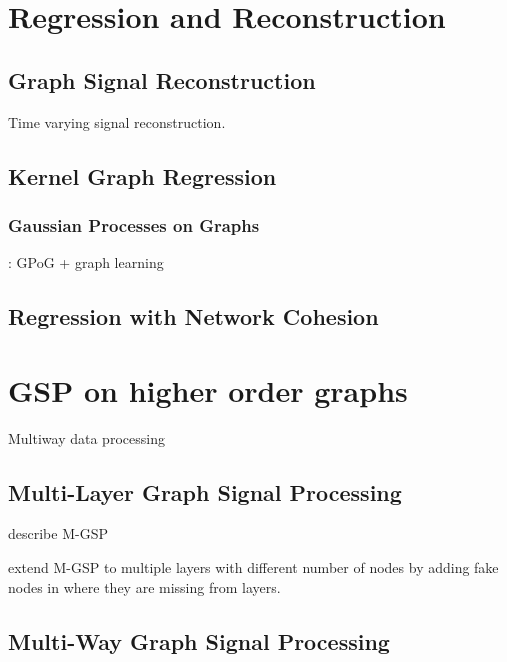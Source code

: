 \section{Regression and Reconstruction}


\subsection{Graph Signal Reconstruction}

\cite{Qiu2017} Time varying signal reconstruction. 

\subsection{Kernel Graph Regression}

\cite{Takeda2007}

\cite{Elias2022}

\cite{Venkitaraman2019}


\subsubsection{Gaussian Processes on Graphs}

\cite{Venkitaraman2020}

\cite{Miao2022}: GPoG + graph learning

\subsection{Regression with Network Cohesion}

\cite{Le2022}

\cite{Li2019}

\section{GSP on higher order graphs}

Multiway data processing 

\cite{Smilde2004}
\cite{Kroonenberg2008}


\cite{Ji2019}

\cite{Cammoun2009}




\subsection{Multi-Layer Graph Signal Processing}

\cite{Zhang2022} describe M-GSP 

\cite{Zhang2018} extend M-GSP to multiple layers with different number of nodes by adding fake nodes in where they are missing from layers. 
 

\subsection{Multi-Way Graph Signal Processing}


\cite{Zhao2023}

\cite{Li2012}

